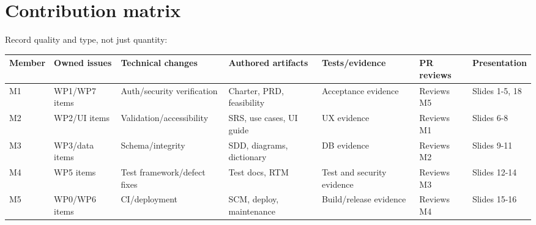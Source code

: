 \documentclass[
  10pt,
  a4paper,
  oneside]{report}
\newcounter{none} %
\begin{document}
\section{Contribution matrix}\label{252-contribution-matrix}

Record quality and type, not just quantity:

{\def\LTcaptype{none} %
\begin{longtable}[]{@{}
  >{\raggedright\arraybackslash}p{}
  >{\raggedright\arraybackslash}p{}
  >{\raggedright\arraybackslash}p{}
  >{\raggedright\arraybackslash}p{}
  >{\raggedright\arraybackslash}p{}
  >{\raggedright\arraybackslash}p{}
  >{\raggedright\arraybackslash}p{}@{}}
\toprule\noalign{}
\begin{minipage}[b]{\linewidth}\raggedright
Member
\end{minipage} & \begin{minipage}[b]{\linewidth}\raggedright
Owned issues
\end{minipage} & \begin{minipage}[b]{\linewidth}\raggedright
Technical changes
\end{minipage} & \begin{minipage}[b]{\linewidth}\raggedright
Authored artifacts
\end{minipage} & \begin{minipage}[b]{\linewidth}\raggedright
Tests/evidence
\end{minipage} & \begin{minipage}[b]{\linewidth}\raggedright
PR reviews
\end{minipage} & \begin{minipage}[b]{\linewidth}\raggedright
Presentation
\end{minipage} \\
\midrule\noalign{}
\endhead
\bottomrule\noalign{}
\endlastfoot
M1 & WP1/WP7 items & Auth/security verification & Charter, PRD,
feasibility & Acceptance evidence & Reviews M5 & Slides 1-5, 18 \\
M2 & WP2/UI items & Validation/accessibility & SRS, use cases, UI guide
& UX evidence & Reviews M1 & Slides 6-8 \\
M3 & WP3/data items & Schema/integrity & SDD, diagrams, dictionary & DB
evidence & Reviews M2 & Slides 9-11 \\
M4 & WP5 items & Test framework/defect fixes & Test docs, RTM & Test and
security evidence & Reviews M3 & Slides 12-14 \\
M5 & WP0/WP6 items & CI/deployment & SCM, deploy, maintenance &
Build/release evidence & Reviews M4 & Slides 15-16 \\
\end{longtable}
}
\end{document}
